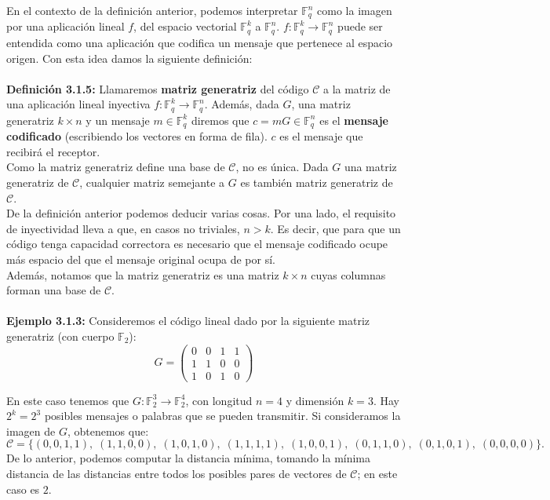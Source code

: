 \documentclass[11pt,spanish]{book}
\begin{document}
En el contexto de la definición anterior, podemos interpretar $\mathbb{F}_{q}^{n}$ como la imagen por una aplicación lineal $f$, del espacio vectorial $\mathbb{F}_{q}^{k}$ a $\mathbb{F}_{q}^{n}$. $f:\mathbb{F}_{q}^{k}\rightarrow\mathbb{F}_{q}^{n}$ puede ser entendida como una aplicación que codifica un mensaje que pertenece al espacio origen. Con esta idea damos la siguiente definición:\\
\\ \textbf{Definición 3.1.5:} Llamaremos \textbf{matriz generatriz} del código $\mathcal{C}$ a la matriz de una aplicación lineal inyectiva $f:\mathbb{F}_{q}^{k}\rightarrow\mathbb{F}_{q}^{n}$. Además, dada $G$, una matriz generatriz $k\times n$ y un mensaje $m\in \mathbb{F}_{q}^{k}$ diremos que $c=mG\in \mathbb{F}_{q}^{n}$ es el \textbf{mensaje codificado} (escribiendo los vectores en forma de fila). $c$ es el mensaje que recibirá el receptor. \\

Como la matriz generatriz define una base de $\mathcal{C}$, no es única. Dada $G$ una matriz generatriz de $\mathcal{C}$, cualquier matriz semejante a $G$ es también matriz generatriz de $\mathcal{C}$.\\

De la definición anterior podemos deducir varias cosas. Por una lado, el requisito de inyectividad lleva a que, en casos no triviales, $ n>k $. Es decir, que para que un código tenga capacidad correctora es necesario que el mensaje codificado ocupe más espacio del que el mensaje original ocupa de por sí.\\

Además, notamos que la matriz generatriz es una matriz $k\times n$ cuyas columnas forman una base de $\mathcal{C}$.\\
\\ \textbf{Ejemplo 3.1.3: } Consideremos el código lineal dado por la siguiente matriz generatriz (con cuerpo $\mathbb{F}_{2}$):
$$G=
\begin{pmatrix}
0 & 0 & 1 & 1\\
1 & 1 & 0 & 0\\
1 & 0 & 1 & 0 
\end{pmatrix}$$

En este caso tenemos que $G:\mathbb{F}_{2}^{3}\rightarrow \mathbb{F}_{2}^{4}$, con longitud $n=4$ y dimensión $k=3$. Hay $2^{k}=2^{3}$ posibles mensajes o palabras que se pueden transmitir. Si consideramos la imagen de $G$, obtenemos que: $$\mathcal{C}=\{(0,0,1,1),\; (1,1,0,0),\;(1,0,1,0),\; (1,1,1,1),\; (1,0,0,1),\;(0,1,1,0),\; (0,1,0,1),\; (0,0,0,0)\}.$$ 
De lo anterior, podemos computar la distancia mínima, tomando la mínima distancia de las distancias entre todos los posibles pares de vectores de $\mathcal{C}$;  en este caso es $2$.\\
\end{document}
